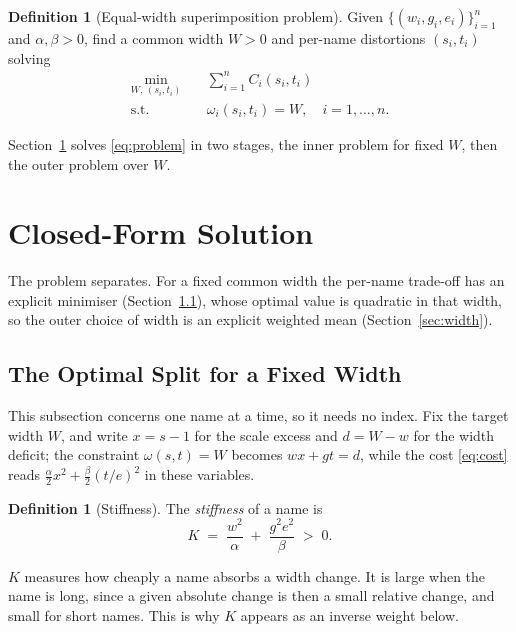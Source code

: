 \documentclass[10pt,twocolumn]{article}
\theoremstyle{plain}
\theoremstyle{definition}
\newtheorem{definition}[proposition]{Definition}
\begin{document}
  \begin{definition}[Equal-width superimposition problem]
    Given $\{(w_i,g_i,e_i)\}_{i=1}^{n}$ and $\alpha,\beta > 0$, find a common width $W > 0$ and per-name distortions $(s_i,t_i)$ solving
    \begin{equation}
      \begin{aligned}
        \min_{W,\,(s_i,t_i)} \quad & \sum_{i=1}^{n} C_i(s_i,t_i)                  \\
        \text{s.t.} \quad          & \omega_i(s_i,t_i) = W, \quad i = 1,\dots,n .
      \end{aligned}
      \label{eq:problem}
    \end{equation}
  \end{definition}

  Section~\ref{sec:solution} solves \eqref{eq:problem} in two stages, the inner problem for fixed $W$, then the outer problem over $W$.

  \section{Closed-Form Solution}
  \label{sec:solution}
  The problem separates.
  For a fixed common width the per-name trade-off has an explicit minimiser (Section~\ref{sec:split}), whose optimal value is quadratic in that width, so the outer choice of width is an explicit weighted mean (Section~\ref{sec:width}).

  \subsection{The Optimal Split for a Fixed Width}
  \label{sec:split}
  This subsection concerns one name at a time, so it needs no index.
  Fix the target width $W$, and write $x = s - 1$ for the scale excess and $d = W - w$ for the width deficit; the constraint $\omega(s,t) = W$ becomes $w x + g t = d$, while the cost \eqref{eq:cost} reads $\frac{\alpha}{2}x^2 + \frac{\beta}{2}(t/e)^2$ in these variables.

  \begin{definition}[Stiffness]
    The \emph{stiffness} of a name is
    \begin{equation}
      K \;=\; \frac{w^2}{\alpha} \;+\; \frac{g^2 e^2}{\beta} \;>\; 0 .
      \label{eq:stiffness}
    \end{equation}
  \end{definition}

  $K$ measures how cheaply a name absorbs a width change.
  It is large when the name is long, since a given absolute change is then a small relative change, and small for short names.
  This is why $K$ appears as an inverse weight below.
\end{document}
